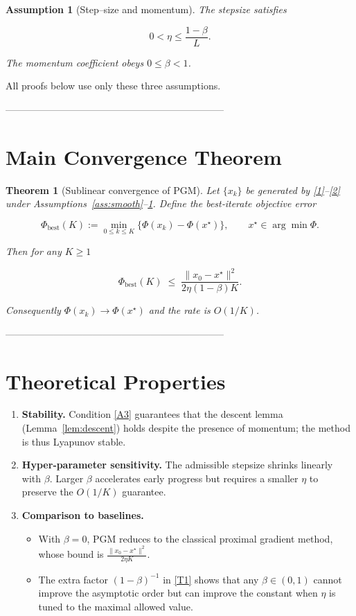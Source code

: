 \documentclass{article}
\newtheorem{theorem}{Theorem}
\newtheorem{assumption}{Assumption}
\begin{document}
\begin{assumption}[Step–size and momentum]\label{ass:param}
The stepsize satisfies  

\[
0<\eta\le\frac{1-\beta}{L}.
\tag{A3}
\]

The momentum coefficient obeys $0\le\beta<1$.
\end{assumption}

All proofs below use only these three assumptions.

--------------------------------------------------------------------

\section*{Main Convergence Theorem}
\begin{theorem}[Sublinear convergence of PGM]\label{thm:sublinear}
Let $\{x_{k}\}$ be generated by \eqref{1}–\eqref{2} under Assumptions~\ref{ass:smooth}–\ref{ass:param}.  
Define the best‑iterate objective error  

\[
\Phi_{\text{best}}(K):=\min_{0\le k\le K}\bigl\{\Phi(x_{k})-\Phi(x^{\star})\bigr\},
\qquad x^{\star}\in\arg\min\Phi.
\]

Then for any $K\ge1$  

\[
\Phi_{\text{best}}(K)\;\le\;\frac{\|x_{0}-x^{\star}\|^{2}}{2\eta(1-\beta)K}.
\tag{T1}
\]

Consequently $\Phi(x_{k})\to\Phi(x^{\star})$ and the rate is $O(1/K)$.
\end{theorem}

--------------------------------------------------------------------

\section*{Theoretical Properties}
\begin{enumerate}[label=\arabic*.]
\item \textbf{Stability.} Condition \eqref{A3} guarantees that the descent lemma (Lemma~\ref{lem:descent}) holds despite the presence of momentum; the method is thus Lyapunov stable.
\item \textbf{Hyper‑parameter sensitivity.} The admissible stepsize shrinks linearly with $\beta$. Larger $\beta$ accelerates early progress but requires a smaller $\eta$ to preserve the $O(1/K)$ guarantee.
\item \textbf{Comparison to baselines.}
\begin{itemize}
\item With $\beta=0$, PGM reduces to the classical proximal gradient method, whose bound is $\frac{\|x_{0}-x^{\star}\|^{2}}{2\eta K}$.
\item The extra factor $(1-\beta)^{-1}$ in \eqref{T1} shows that any $\beta\in(0,1)$ cannot improve the asymptotic order but can improve the constant when $\eta$ is tuned to the maximal allowed value.
\end{itemize}
\end{enumerate}
\end{document}
